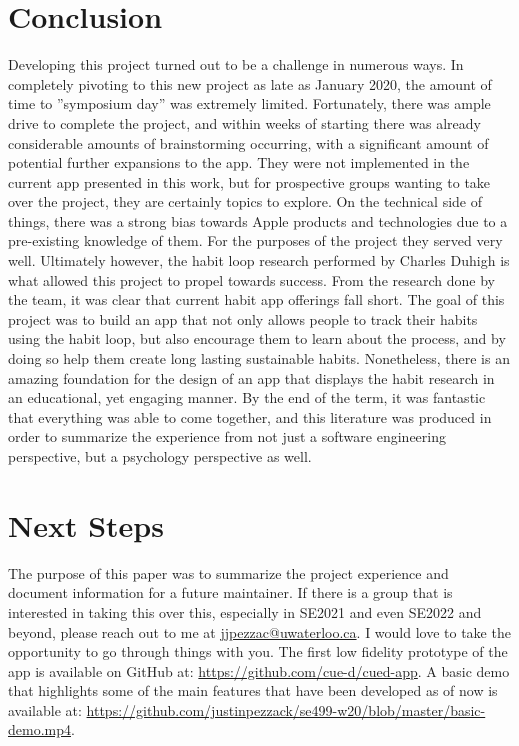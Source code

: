 \section{Conclusion}
Developing this project turned out to be a challenge in numerous ways. In completely pivoting to this new project as late as January 2020, the amount of time to ”symposium day” was extremely limited. Fortunately, there was ample drive to complete the project, and within weeks of starting there was already considerable amounts of brainstorming occurring, with a significant amount of potential further expansions to the app. They were not implemented in the current app presented in this work, but for prospective groups wanting to take over the project, they are certainly topics to explore. On the technical side of things, there was a strong bias towards Apple products and technologies due to a pre-existing knowledge of them. For the purposes of the project they served very well. Ultimately however, the habit loop research performed by Charles Duhigh is what allowed this project to propel towards success. From the research done by the team, it was clear that current habit app offerings fall short. The goal of this project was to build an app that not only allows people to track their habits using the habit loop, but also encourage them to learn about the process, and by doing so help them create long lasting sustainable habits. Nonetheless, there is an amazing foundation for the design of an app that displays the habit research in an educational, yet engaging manner. By the end of the term, it was fantastic that everything was able to come together, and this literature was produced in order to summarize the experience from not just a software engineering perspective, but a psychology perspective as well.
\section{Next Steps} 
The purpose of this paper was to summarize the project experience and document information for a future maintainer. If there is a group that is interested in taking this over this, especially in SE2021 and even SE2022 and beyond, please reach out to me at \url{jjpezzac@uwaterloo.ca}. I would love to take the opportunity to go through things with you. The first low fidelity prototype of the app is available on GitHub at: \url{https://github.com/cue-d/cued-app}. A basic demo that highlights some of the main features that have been developed as of now is available at: \url{https://github.com/justinpezzack/se499-w20/blob/master/basic-demo.mp4}.